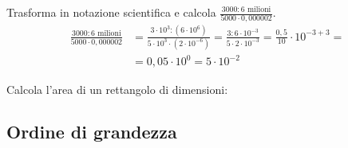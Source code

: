 \begin{esempio}{}{}
Trasforma in notazione scientifica e calcola
\(\displaystyle{\frac{3000:6\text{ milioni}}{5000\cdot0,000002}}\).
\begin{align*}
  \frac{3000:6\text{ milioni}}{5000\cdot0,000002}&=\frac{3\cdot10^3:
    (6\cdot 10^6)}{5\cdot10^3\cdot(2\cdot10^{-6})}
  =\frac{3:6\cdot10^{-3}}{5\cdot2\cdot 10^{-3}}
  =\frac{0,5}{10}\cdot10^{-3+3} = \\
 &= 0,05\cdot10^0 = 5\cdot10^{-2}
\end{align*}
\end{esempio}

\begin{esempio}{}{}
Calcola l'area di un rettangolo di dimensioni: 

\end{esempio}



\subsection{Ordine di grandezza}

